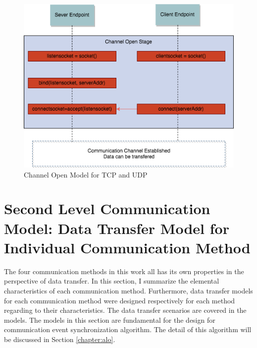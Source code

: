 \begin{figure}[H]
\centerline{\includegraphics[scale=0.55]{Figures/channelopen2}}
 \caption{Channel Open Model for TCP and UDP}
\label{channelopen2}
\end{figure}

\section{Second Level Communication Model: Data Transfer Model for Individual Communication Method}
The four communication methods in this work all has its own properties in the perspective of data transfer. In this section, I summarize the elemental characteristics of each communication method. Furthermore, data transfer models for each communication method were designed respectively for each method regarding to their characteristics. The data transfer scenarios are covered in the models. The models in this section are fundamental for the design for communication event synchronization algorithm. The detail of this algorithm will be discussed in Section \ref{chapter:alo}.
